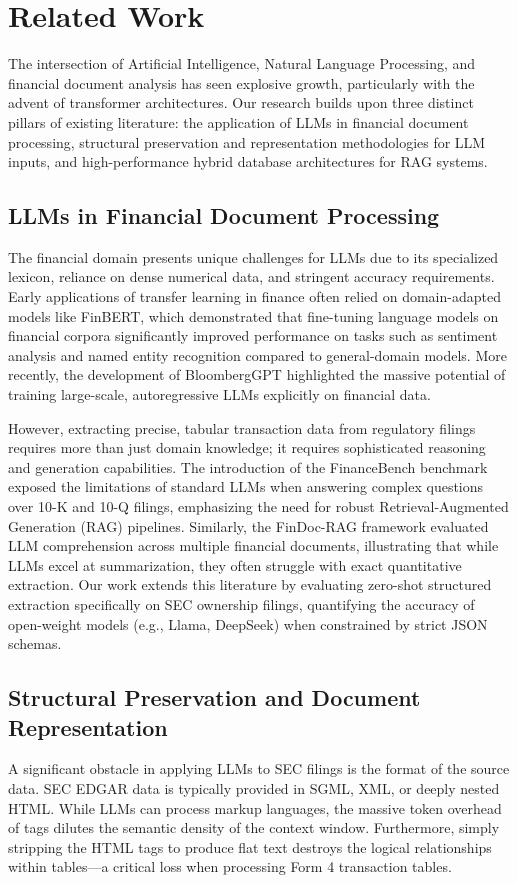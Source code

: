 \documentclass[journal, onecolumn]{IEEEtran}
\begin{document}
\section{Related Work}
The intersection of Artificial Intelligence, Natural Language Processing, and financial document analysis has seen explosive growth, particularly with the advent of transformer architectures. Our research builds upon three distinct pillars of existing literature: the application of LLMs in financial document processing, structural preservation and representation methodologies for LLM inputs, and high-performance hybrid database architectures for RAG systems.

\subsection{LLMs in Financial Document Processing}
The financial domain presents unique challenges for LLMs due to its specialized lexicon, reliance on dense numerical data, and stringent accuracy requirements. Early applications of transfer learning in finance often relied on domain-adapted models like FinBERT, which demonstrated that fine-tuning language models on financial corpora significantly improved performance on tasks such as sentiment analysis and named entity recognition compared to general-domain models. More recently, the development of BloombergGPT \cite{wu2023bloomberggpt} highlighted the massive potential of training large-scale, autoregressive LLMs explicitly on financial data. 

However, extracting precise, tabular transaction data from regulatory filings requires more than just domain knowledge; it requires sophisticated reasoning and generation capabilities. The introduction of the FinanceBench benchmark \cite{islam2023financebench} exposed the limitations of standard LLMs when answering complex questions over 10-K and 10-Q filings, emphasizing the need for robust Retrieval-Augmented Generation (RAG) pipelines. Similarly, the FinDoc-RAG framework \cite{gu2023findocrag} evaluated LLM comprehension across multiple financial documents, illustrating that while LLMs excel at summarization, they often struggle with exact quantitative extraction. Our work extends this literature by evaluating zero-shot structured extraction specifically on SEC ownership filings, quantifying the accuracy of open-weight models (e.g., Llama, DeepSeek) when constrained by strict JSON schemas.

\subsection{Structural Preservation and Document Representation}
A significant obstacle in applying LLMs to SEC filings is the format of the source data. SEC EDGAR data is typically provided in SGML, XML, or deeply nested HTML. While LLMs can process markup languages, the massive token overhead of tags dilutes the semantic density of the context window. Furthermore, simply stripping the HTML tags to produce flat text destroys the logical relationships within tables—a critical loss when processing Form 4 transaction tables.
\end{document}
